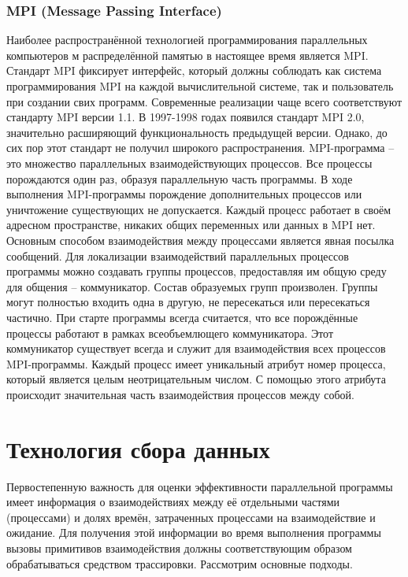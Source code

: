 \subsubsection{MPI (Message Passing Interface)}
Наиболее распространённой технологией программирования параллельных компьютеров м распределённой памятью в настоящее время является MPI. Стандарт MPI фиксирует интерфейс, который должны соблюдать как система программирования MPI на каждой вычислительной системе, так и пользователь при создании свих программ. Современные реализации чаще всего соответствуют стандарту MPI версии 1.1. В 1997-1998 годах появился стандарт MPI 2.0, значительно расширяющий функциональность предыдущей версии. Однако, до сих пор этот стандарт не получил широкого распространения.
MPI-программа – это множество параллельных взаимодействующих процессов. Все процессы порождаются один раз, образуя параллельную часть программы. В ходе выполнения MPI-программы порождение дополнительных процессов или уничтожение существующих не допускается.
Каждый процесс работает в своём адресном пространстве, никаких общих переменных или данных в MPI нет. Основным способом взаимодействия между процессами является явная посылка сообщений. Для локализации взаимодействий параллельных процессов программы можно создавать группы процессов, предоставляя им общую среду для общения – коммуникатор. Состав образуемых групп произволен. Группы могут полностью входить одна в другую, не пересекаться или пересекаться частично. При старте программы всегда считается, что все порождённые процессы работают в рамках всеобъемлющего коммуникатора. Этот коммуникатор существует всегда и служит для взаимодействия всех процессов MPI-программы.
Каждый процесс имеет уникальный атрибут номер процесса, который является целым неотрицательным числом. С помощью этого атрибута происходит значительная часть взаимодействия процессов между собой. 
\section{Технология сбора данных}
Первостепенную важность для оценки эффективности параллельной программы имеет информация о взаимодействиях между её отдельными частями (процессами) и долях времён, затраченных процессами на взаимодействие и ожидание. Для  получения этой информации во время выполнения программы вызовы примитивов взаимодействия должны соответствующим образом обрабатываться средством трассировки. Рассмотрим основные подходы.
